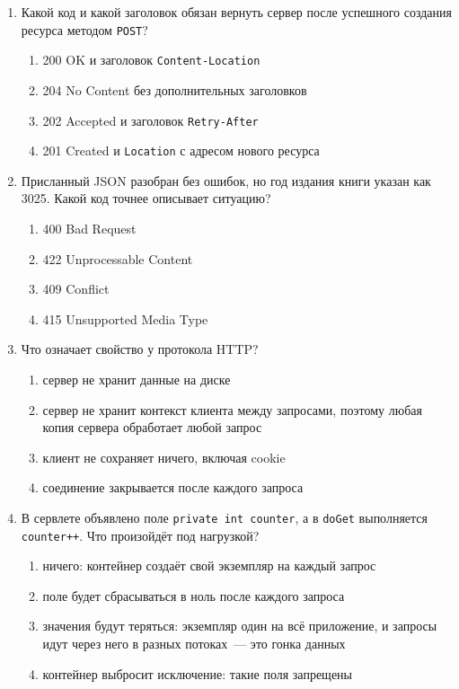 \begin{enumerate}
\item Какой код и какой заголовок обязан вернуть сервер после успешного
      создания ресурса методом \texttt{POST}?
  \begin{enumerate}
    \item[а)] 200 OK и заголовок \texttt{Content-Location}
    \item[б)] 204 No Content без дополнительных заголовков
    \item[в)] 202 Accepted и заголовок \texttt{Retry-After}
    \item[г)] 201 Created и \texttt{Location} с адресом нового ресурса
  \end{enumerate}

\item Присланный JSON разобран без ошибок, но год издания книги указан как
      3025. Какой код точнее описывает ситуацию?
  \begin{enumerate}
    \item[а)] 400 Bad Request
    \item[б)] 422 Unprocessable Content
    \item[в)] 409 Conflict
    \item[г)] 415 Unsupported Media Type
  \end{enumerate}

\item Что означает свойство  у протокола HTTP?
  \begin{enumerate}
    \item[а)] сервер не хранит данные на диске
    \item[б)] сервер не хранит контекст клиента между запросами, поэтому любая
          копия сервера обработает любой запрос
    \item[в)] клиент не сохраняет ничего, включая cookie
    \item[г)] соединение закрывается после каждого запроса
  \end{enumerate}

\item В сервлете объявлено поле \texttt{private int counter}, а в
      \texttt{doGet} выполняется \texttt{counter++}. Что произойдёт под
      нагрузкой?
  \begin{enumerate}
    \item[а)] ничего: контейнер создаёт свой экземпляр на каждый запрос
    \item[б)] поле будет сбрасываться в ноль после каждого запроса
    \item[в)] значения будут теряться: экземпляр один на всё приложение, и
          запросы идут через него в разных потоках~--- это гонка данных
    \item[г)] контейнер выбросит исключение: такие поля запрещены
  \end{enumerate}


\end{enumerate}
